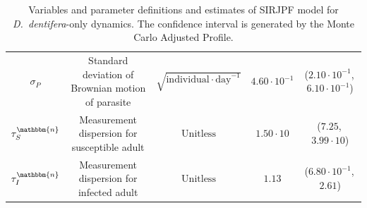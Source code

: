 \documentclass[aoas,preprint]{imsart}\usepackage[]{graphicx}\usepackage[]{xcolor}
\newcommand\native{\mathbbm{n}}
\begin{document}
\begin{table}[H]
{\begin{tabular}{||c|c |c|c|c||}
$\sigma_{P}$   & Standard deviation of Brownian motion of parasite                      &   $\sqrt{\mathrm{individual} \cdot \mathrm{day}^{-1}}$  & $4.60\cdot 10^{-1}$  & ($2.10\cdot 10^{-1}$,\,$6.10\cdot 10^{-1}$)\\
$\tau^{\native}_{S}$      &  Measurement dispersion for susceptible adult                 &$\mathrm{Unitless}$           & $1.50\cdot 10$  & ($7.25$,\,$3.99\cdot 10$)\\
$\tau^{\native}_{I}$      &  Measurement dispersion for infected adult                &$\mathrm{Unitless}$            & $1.13$  & ($6.80\cdot 10^{-1}$,\,$2.61$)\\
\hline
\end{tabular}}
\caption{Variables and parameter definitions and estimates of SIRJPF model for \textit{D.~dentifera}-only dynamics. The confidence interval is generated by the Monte Carlo Adjusted Profile.}
\label{Table:SIRJPF_native}
\end{table}
\end{document}

